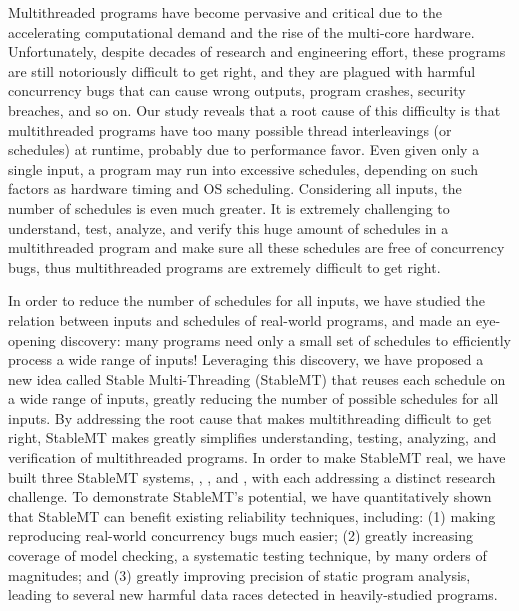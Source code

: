 Multithreaded programs have become pervasive and critical due to the
accelerating computational demand and the rise of the multi-core hardware.
Unfortunately, despite decades of research and engineering effort, these
programs are still notoriously difficult to get right, and they are plagued with
harmful concurrency bugs that can cause wrong outputs, program crashes, security
breaches, and so on. Our study reveals that a root cause of this difficulty is
that multithreaded programs have too many possible thread interleavings (or
schedules) at runtime, probably due to performance favor. Even given only a
single input, a program may run into excessive schedules, depending on such
factors as hardware timing and OS scheduling. Considering all inputs, the number
of schedules is even much greater. It is extremely challenging to understand,
test, analyze, and verify this huge amount of schedules in a multithreaded
program and make sure all these schedules are free of concurrency bugs, thus
multithreaded programs are extremely difficult to get right.

In order to reduce the number of schedules for all inputs, we have studied the
relation between inputs and schedules of real-world programs, and made an
eye-opening discovery: many programs need only a small set of schedules to
efficiently process a wide range of inputs! Leveraging this discovery, we have
proposed a new idea called Stable Multi-Threading (StableMT) that reuses each
schedule on a wide range of inputs, greatly reducing the number of possible
schedules for all inputs. By addressing the root cause that makes multithreading
difficult to get right, StableMT makes greatly simplifies understanding,
testing, analyzing, and verification of multithreaded programs. In order to make
StableMT real, we have built three StableMT systems, \tern, \peregrine, and
\parrot, with each addressing a distinct research challenge. To demonstrate
StableMT's potential, we have quantitatively shown that StableMT can benefit
existing reliability techniques, including: (1) making reproducing real-world
concurrency bugs much easier; (2) greatly increasing coverage of model checking,
a systematic testing technique, by many orders of magnitudes; and (3) greatly
improving precision of static program analysis, leading to several new harmful
data races detected in heavily-studied programs.

